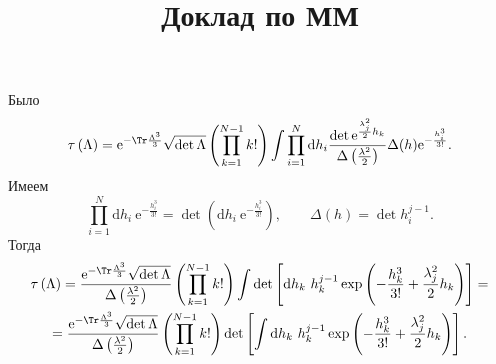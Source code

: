 \documentclass[a4paper, 14pt]{extarticle}
\title{Доклад по ММ}
\begin{document}
	\maketitle
Было
\[
	\tau\left( \Lambda \right) ={\mathrm{e} ^{-\Tr  \frac{\Lambda^3}{3}}\sqrt{\det \Lambda} 
}\left( \prod_{k=1}^{N-1} k!  \right) \int
\prod_{i=1}^{N} \mathrm{d} h_i
\frac{\det \mathrm{e} ^{\frac{\lambda_j^2}{2}h_k}}{
\Delta \left( \frac{\lambda^2}{2} \right) 
}\Delta (h) \mathrm{e} ^{-\frac{h_i^3}{3!}}
.\] 
Имеем
\[
	\prod_{i=1}^{N} \mathrm{d} h_i \ \mathrm{e} ^{- \frac{h_i^3}{3!}}=\det \left(\mathrm{d} h_i \ \mathrm{e} ^{- \frac{h_i^3}{3!}}\right),\qquad \Delta(h)= \det h_{i}^{j-1}
.\] 
Тогда
\begin{multline*}
	\tau\left( \Lambda \right) =\frac{\mathrm{e} ^{-\Tr  \frac{\Lambda^3}{3}}\sqrt{\det \Lambda} 
}{\Delta \left( \frac{\lambda^2}{2} \right)}\left( \prod_{k=1}^{N-1} k!  \right) \int
\det \left[ \mathrm{d} h_k\ h_k^{j-1} \exp \left(-\frac{h_k^3}{3!}+\frac{\lambda_j^2}{2}h_k\right)\right]=\\=
\frac{\mathrm{e} ^{-\Tr  \frac{\Lambda^3}{3}}\sqrt{\det \Lambda} 
}{\Delta \left( \frac{\lambda^2}{2} \right)}\left( \prod_{k=1}^{N-1} k!  \right) 
\det \left[\int \mathrm{d} h_k\ h_k^{j-1} \exp \left(-\frac{h_k^3}{3!}+\frac{\lambda_j^2}{2}h_k\right)\right]
.\end{multline*}
\end{document}
